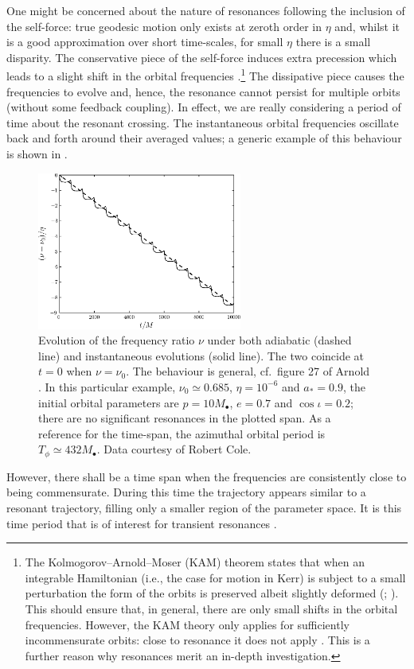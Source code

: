 One might be concerned about the nature of resonances following the inclusion of the self-force: true geodesic motion only exists at zeroth order in $\eta$ and, whilst it is a good approximation over short time-scales, for small $\eta$ there is a small disparity. The conservative piece of the self-force induces extra precession which leads to a slight shift in the orbital frequencies \citep{Warburton2012}.\footnote{The Kolmogorov--Arnold--Moser (KAM) theorem states that when an integrable Hamiltonian (i.e., the case for motion in Kerr) is subject to a small perturbation the form of the orbits is preserved albeit slightly deformed (\citealt{Arnold1963}; \citealt[chapter II, section 3.3 d]{Moser1973}). This should ensure that, in general, there are only small shifts in the orbital frequencies. However, the KAM theory only applies for sufficiently incommensurate orbits: close to resonance it does not apply \citep[chapter V, section 1 c]{Moser1973}. This is a further reason why resonances merit an in-depth investigation.} The dissipative piece causes the frequencies to evolve and, hence, the resonance cannot persist for multiple orbits (without some feedback coupling). In effect, we are really considering a period of time about the resonant crossing. The instantaneous orbital frequencies oscillate back and forth around their averaged values; a generic example of this behaviour is shown in .
\begin{figure}%
\centering
\vspace{0.25\baselineskip}
\includegraphics[width=0.6\textwidth]{./images/Fig_ad_vs_inst_wibble}
\caption{Evolution of the frequency ratio $\nu$ under both adiabatic (dashed line) and instantaneous evolutions (solid line). The two coincide at $t = 0$ when $\nu = \nu_0$. The behaviour is general, cf.\ figure 27 of Arnold \citep{Arnold1988}. In this particular example, $\nu_0 \simeq 0.685$, $\eta = 10^{-6}$ and $a_\ast = 0.9$, the initial orbital parameters are $p = 10 M_\bullet$, $e = 0.7$ and $\cos \iota = 0.2$; there are no significant resonances in the plotted span. As a reference for the time-span, the azimuthal orbital period is $T_\phi \simeq 432 M_\bullet$. Data courtesy of Robert Cole.}\label{fig:wibbles}
\end{figure}
However, there shall be a time span when the frequencies are consistently close to being commensurate. During this time the trajectory appears similar to a resonant trajectory, filling only a smaller region of the parameter space. It is this time period that is of interest for transient resonances \citep{Bosley1992}.

